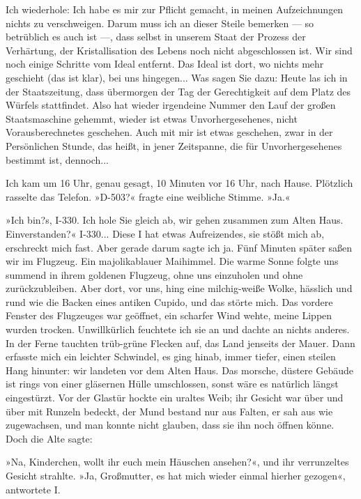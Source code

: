 Ich wiederhole: Ich habe es mir zur Pflicht gemacht, in meinen
Aufzeichnungen nichts zu verschweigen. Darum muss ich an dieser
Steile bemerken — so betrüblich es auch ist —, dass selbst in
unserem Staat der Prozess der Verhärtung, der Kristallisation des
Lebens noch nicht abgeschlossen ist. Wir sind noch einige Schritte
vom Ideal entfernt. Das Ideal ist dort, wo nichts mehr geschieht
(das ist klar), bei uns hingegen... Was sagen Sie dazu: Heute las
ich in der Staatszeitung, dass übermorgen der Tag der Gerechtigkeit
auf dem Platz des Würfels stattfindet. Also hat wieder irgendeine
Nummer den Lauf der großen Staatsmaschine gehemmt, wieder ist etwas
Unvorhergesehenes, nicht Vorausberechnetes geschehen. Auch mit mir
ist etwas geschehen, zwar in der Persönlichen Stunde, das heißt, in
jener Zeitspanne, die für Unvorhergesehenes bestimmt ist,
dennoch...

Ich kam um 16 Uhr, genau gesagt, 10 Minuten vor 16 Uhr, nach Hause.
Plötzlich rasselte das Telefon. »D-503?« fragte eine weibliche
Stimme. »Ja.«

»Ich bin?s, I-330. Ich hole Sie gleich ab, wir gehen zusammen zum
Alten Haus. Einverstanden?« I-330... Diese I hat etwas
Aufreizendes, sie stößt mich ab, erschreckt mich fast. Aber gerade
darum sagte ich ja. Fünf Minuten später saßen wir im Flugzeug. Ein
majolikablauer Maihimmel. Die warme Sonne folgte uns summend in
ihrem goldenen Flugzeug, ohne uns einzuholen und ohne
zurückzubleiben. Aber dort, vor uns, hing eine milchig-weiße Wolke,
hässlich und rund wie die Backen eines antiken Cupido, und das
störte mich. Das vordere Fenster des Flugzeuges war geöffnet, ein
scharfer Wind wehte, meine Lippen wurden trocken. Unwillkürlich
feuchtete ich sie an und dachte an nichts anderes. In der Ferne
tauchten trüb-grüne Flecken auf, das Land jenseits der Mauer. Dann
erfasste mich ein leichter Schwindel, es ging hinab, immer tiefer,
einen steilen Hang hinunter: wir landeten vor dem Alten Haus. Das
morsche, düstere Gebäude ist rings von einer gläsernen Hülle
umschlossen, sonst wäre es natürlich längst eingestürzt. Vor der
Glastür hockte ein uraltes Weib; ihr Gesicht war über und über mit
Runzeln bedeckt, der Mund bestand nur aus Falten, er sah aus wie
zugewachsen, und man konnte nicht glauben, dass sie ihn noch öffnen
könne. Doch die Alte sagte:

»Na, Kinderchen, wollt ihr euch mein Häuschen ansehen?«, und ihr
verrunzeltes Gesicht strahlte. »Ja, Großmutter, es hat mich wieder
einmal hierher gezogen«, antwortete I.


